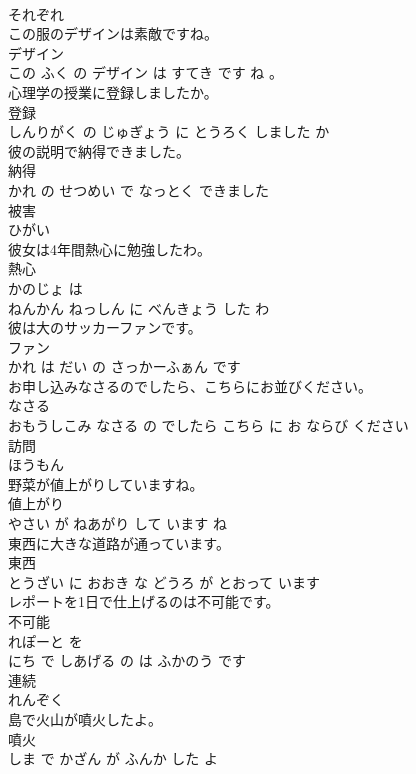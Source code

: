 \documentclass[8pt]{extreport}
\begin{document}
\begin{CJK}{UTF8}{min}
\\	それぞれ	
\\	この服のデザインは素敵ですね。	
\\	デザイン 
\\	この ふく の デザイン は すてき です ね 。			
\\	心理学の授業に登録しましたか。	
\\	登録 
\\	しんりがく の じゅぎょう に とうろく しました か			
\\	彼の説明で納得できました。	
\\	納得 
\\	かれ の せつめい で なっとく できました			
\\	被害	
\\	ひがい		
\\	彼女は4年間熱心に勉強したわ。	
\\	熱心 
\\	かのじょ は 
\\	ねんかん ねっしん に べんきょう した わ			
\\	彼は大のサッカーファンです。	
\\	ファン 
\\	かれ は だい の さっかーふぁん です			
\\	お申し込みなさるのでしたら、こちらにお並びください。	
\\	なさる 
\\	おもうしこみ なさる の でしたら こちら に お ならび ください			
\\	訪問	
\\	ほうもん		
\\	野菜が値上がりしていますね。	
\\	値上がり 
\\	やさい が ねあがり して います ね			
\\	東西に大きな道路が通っています。	
\\	東西 
\\	とうざい に おおき な どうろ が とおって います			
\\	レポートを1日で仕上げるのは不可能です。	
\\	不可能 
\\	れぽーと を 
\\	にち で しあげる の は ふかのう です			
\\	連続	
\\	れんぞく		
\\	島で火山が噴火したよ。	
\\	噴火 
\\	しま で かざん が ふんか した よ			

\end{CJK}
\end{document}
